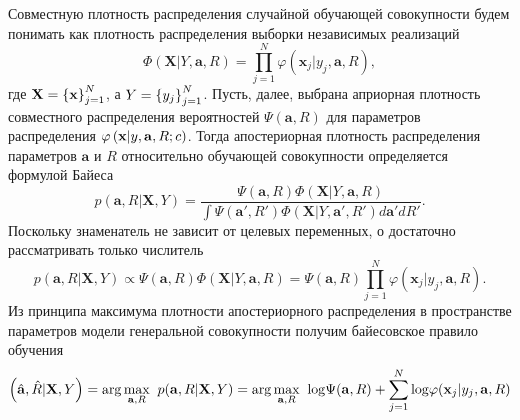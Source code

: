 Совместную плотность распределения случайной обучающей совокупности будем понимать как плотность 
распределения выборки независимых реализаций
$$\Phi(\mathbf{X}|Y,\mathbf{a},R)=\prod \limits_{j=1}^N \varphi(\mathbf{x}_j|y_j,\mathbf{a},R),$$ 
где $\mathbf{X}= \left\{\mathbf{x}\right\}_{j=1}^N$, а $Y = \left\{y_j\right\}_{j=1}^N$.
Пусть, далее, выбрана априорная плотность совместного распределения вероятностей $\Psi(\mathbf{a},R)$ 
для параметров распределения $\varphi \left(\mathbf x | y,\mathbf{a},R;c\right)$. Тогда апостериорная
 плотность распределения параметров $\mathbf{a}$ и $R$ относительно обучающей совокупности определяется 
формулой Байеса
$$p(\mathbf{a},R|\mathbf{X},Y)=\frac{\Psi(\mathbf{a},R) \Phi(\mathbf{X}|Y,\mathbf{a},R)}
{\int {\Psi(\mathbf{a}',R') \Phi(\mathbf{X}|Y,\mathbf{a}',R')d\mathbf{a}'dR'}}.$$
Поскольку знаменатель не зависит от целевых переменных, о достаточно рассматривать только числитель
$$p(\mathbf{a},R|\mathbf{X},Y) \propto \Psi(\mathbf{a},R) \Phi(\mathbf{X}|Y,\mathbf{a},R) = 
\Psi(\mathbf{a},R) \prod \limits_{j=1}^N \varphi(\mathbf{x}_j|y_j,\mathbf{a},R).$$
Из принципа максимума плотности апостериорного распределения в пространстве параметров модели генеральной
 совокупности получим байесовское правило обучения
$$\left(\hat{\mathbf{a}},\hat{R}|\mathbf{X},Y\right)
	= \arg\underset{\mathbf{a},R}{\max}\;\; p(\mathbf{a},R|\mathbf{X},Y) 
	= \arg\underset{\mathbf{a},R}{\max}\;\; {\log}\Psi(\mathbf{a},R) + \sum\limits_{j=1}^N{\log}\varphi(\mathbf{x}_j|y_j,\mathbf{a},R) $$


